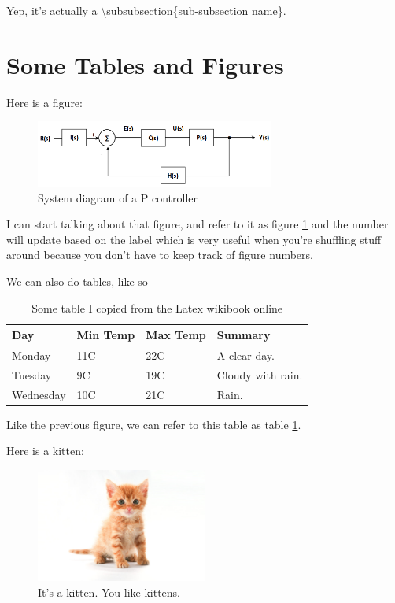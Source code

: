 \documentclass[12pt]{article}
\begin{document}
	Yep, it's actually a \textbackslash subsubsection\{sub-subsection name\}.

	\section{Some Tables and Figures}

	Here is a figure:

	\begin{figure}[!ht]
	\centering
	\includegraphics[width=0.7\textwidth]{pcontroller}
	\caption{System diagram of a P controller}
	\label{pcontroller}
	\end{figure}

	I can start talking about that figure, and refer to it as figure \ref{pcontroller} and the number will update based on the label which is very useful when you're shuffling stuff around because you don't have to keep track of figure numbers.

	We can also do tables, like so

	\begin{center}
		\begin{table}[!ht]
			\begin{tabular}{ | l | l | l | p{5cm} |}
			\hline
			Day & Min Temp & Max Temp & Summary \\ \hline
			Monday & 11C & 22C & A clear day. \\ 	\hline
			Tuesday & 9C & 19C & Cloudy with rain.\\ \hline
			Wednesday & 10C & 21C & Rain. \\
			\hline
			\end{tabular}
			\caption{Some table I copied from the Latex wikibook online}
			\label{shittytable}
		\end{table}
	\end{center}

	Like the previous figure, we can refer to this table as table \ref{shittytable}.

	Here is a kitten:

	\begin{figure}[!ht]
	\label{kitten}
	\centering
	\includegraphics[width=0.5\textwidth]{kitten}
	\caption{It's a kitten. You like kittens.}
	\end{figure}
\end{document}
